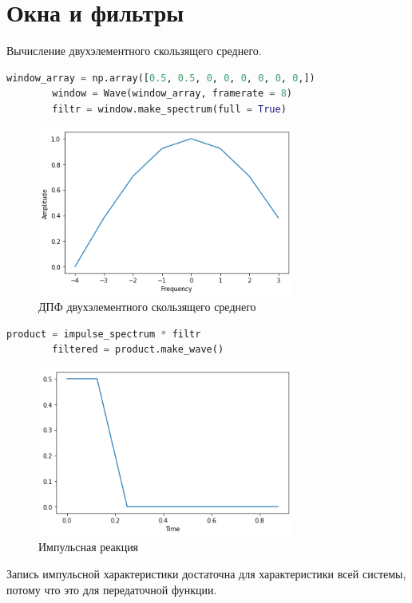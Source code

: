 \documentclass[a4paper, 12pt]{report}
\begin{document}
	\chapter{Окна и фильтры}
	Вычисление двухэлементного скользящего среднего.
	\begin{lstlisting}[language=Python,caption=Найдем двухэлементное скользящее среднее]
		window_array = np.array([0.5, 0.5, 0, 0, 0, 0, 0, 0,])
		window = Wave(window_array, framerate = 8)
		filtr = window.make_spectrum(full = True)
	\end{lstlisting}
	\begin{figure}[H]
		\centering
		\includegraphics[width=0.75\textwidth]{sys1.png}
		\caption{ДПФ двухэлементного скользящего среднего}
		\label{fig:sys1}
	\end{figure}
	\begin{lstlisting}[language=Python,caption=Умножение передаточной функции на спектр импульса]
		product = impulse_spectrum * filtr
		filtered = product.make_wave()
	\end{lstlisting}
	\begin{figure}[H]
		\centering
		\includegraphics[width=0.75\textwidth]{sys2.png}
		\caption{Импульсная реакция}
		\label{fig:sys2}
	\end{figure}
	Запись импульсной характеристики достаточна для характеристики всей системы, потому что это  для передаточной функции.
\end{document}
